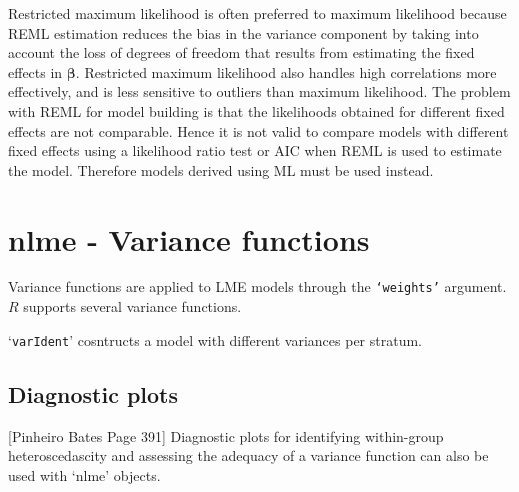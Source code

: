 \documentclass[MAIN.tex]{subfiles}
\begin{document}
Restricted maximum likelihood is often preferred to maximum likelihood because REML estimation reduces the bias in the variance component by taking into account the loss of degrees of freedom that results
from estimating the fixed effects in $\boldsymbol{\beta}$. Restricted maximum likelihood also handles high correlations more effectively, and is less sensitive to outliers than maximum likelihood.  The problem with REML for model building is that the likelihoods obtained for different fixed effects are not comparable. Hence it is not valid to compare models with different fixed effects using a likelihood ratio test or AIC when REML is used to
estimate the model. Therefore models derived using ML must be used instead.









\section{nlme - Variance functions}

Variance functions are applied to LME models through the \texttt{`weights'} argument. $R$ supports several variance functions.

`\texttt{varIdent}' cosntructs a model with different variances per stratum.

\subsection{Diagnostic plots}
[Pinheiro Bates Page 391] Diagnostic plots for identifying within-group heteroscedascity and assessing the adequacy of a variance function can also be used with `nlme' objects.
\end{document}
